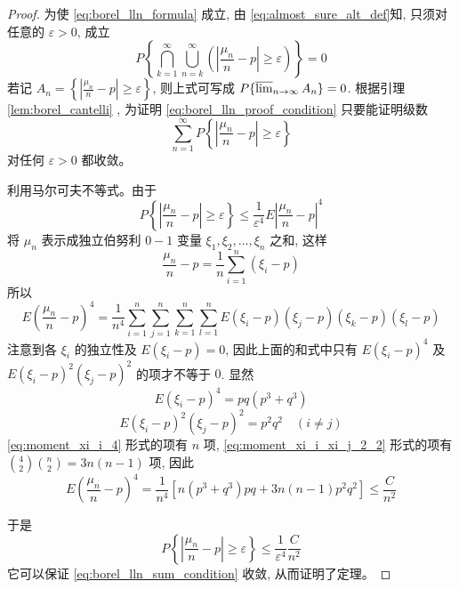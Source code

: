 \begin{proof}
为使 \eqref{eq:borel_lln_formula} 成立, 由 \eqref{eq:almost_sure_alt_def}知, 只须对任意的 $\varepsilon>0$, 成立
\begin{equation} \label{eq:borel_lln_proof_condition}
P\left\{ \bigcap_{k=1}^\infty \bigcup_{n=k}^\infty \left(\left|\frac{\mu_n}{n}-p\right|\ge\varepsilon\right) \right\}=0
\end{equation}
若记 $A_n=\left\{\left|\frac{\mu_n}{n}-p\right|\ge\varepsilon\right\}$, 则上式可写成 $P\{\varlimsup_{n\to\infty} A_n\}=0$. 根据引理 \ref{lem:borel_cantelli} , 为证明 \eqref{eq:borel_lln_proof_condition} 只要能证明级数
\begin{equation} \label{eq:borel_lln_sum_condition}
\sum_{n=1}^\infty P\left\{ \left|\frac{\mu_n}{n}-p\right| \ge \varepsilon \right\}
\end{equation}
对任何 $\varepsilon>0$ 都收敛。

利用马尔可夫不等式。由于
\begin{equation} \label{eq:markov_inequality_mu_n}
P\left\{ \left|\frac{\mu_n}{n}-p\right| \ge \varepsilon \right\} \le \frac{1}{\varepsilon^4}E\left|\frac{\mu_n}{n}-p\right|^4
\end{equation}
将 $\mu_n$ 表示成独立伯努利 $0-1$ 变量 $\xi_1, \xi_2, \ldots, \xi_n$ 之和, 这样
\[
\frac{\mu_n}{n} - p = \frac{1}{n}\sum_{i=1}^n (\xi_i - p)
\]
所以
\[
E\left(\frac{\mu_n}{n}-p\right)^4 = \frac{1}{n^4}\sum_{i=1}^n \sum_{j=1}^n \sum_{k=1}^n \sum_{l=1}^n E(\xi_i - p)(\xi_j - p)(\xi_k - p)(\xi_l - p)
\]
注意到各 $\xi_i$ 的独立性及 $E(\xi_i - p)=0$, 因此上面的和式中只有 $E(\xi_i-p)^4$ 及 $E(\xi_i-p)^2(\xi_j-p)^2$ 的项才不等于 $0$. 显然
\begin{equation} \label{eq:moment_xi_i_4}
E(\xi_i-p)^4 = pq(p^3 + q^3)
\end{equation}
\begin{equation} \label{eq:moment_xi_i_xi_j_2_2}
E(\xi_i-p)^2(\xi_j-p)^2 = p^2q^2 \quad (i\ne j)
\end{equation}
\eqref{eq:moment_xi_i_4} 形式的项有 $n$ 项, \eqref{eq:moment_xi_i_xi_j_2_2} 形式的项有 $\binom{4}{2}\binom{n}{2} = 3n(n-1)$ 项, 因此
\begin{equation} \label{eq:fourth_moment_simplified}
E\left(\frac{\mu_n}{n}-p\right)^4 = \frac{1}{n^4}[n(p^3+q^3)pq + 3n(n-1)p^2q^2] \le \frac{C}{n^2}
\end{equation}

于是
\begin{equation} \label{eq:prob_bound_with_n2}
P\left\{ \left|\frac{\mu_n}{n}-p\right| \ge \varepsilon \right\} \le \frac{1}{\varepsilon^4} \frac{C}{n^2}
\end{equation}
它可以保证 \eqref{eq:borel_lln_sum_condition} 收敛, 从而证明了定理。
\end{proof}
